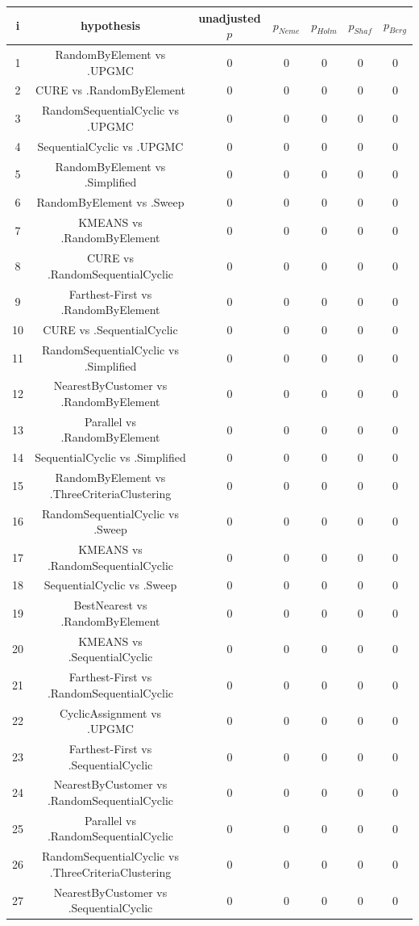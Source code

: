 \documentclass[a4paper,10pt]{article}
\begin{document}
\begin{landscape}
\begin{table}[!htp]
\centering\scriptsize
\begin{tabular}{ccccccc}
i&hypothesis&unadjusted $p$&$p_{Neme}$&$p_{Holm}$&$p_{Shaf}$&$p_{Berg}$\\
\hline1&RandomByElement vs .UPGMC&0&0&0&0&0\\
2&CURE vs .RandomByElement&0&0&0&0&0\\
3&RandomSequentialCyclic vs .UPGMC&0&0&0&0&0\\
4&SequentialCyclic vs .UPGMC&0&0&0&0&0\\
5&RandomByElement vs .Simplified&0&0&0&0&0\\
6&RandomByElement vs .Sweep&0&0&0&0&0\\
7&KMEANS vs .RandomByElement&0&0&0&0&0\\
8&CURE vs .RandomSequentialCyclic&0&0&0&0&0\\
9&Farthest-First vs .RandomByElement&0&0&0&0&0\\
10&CURE vs .SequentialCyclic&0&0&0&0&0\\
11&RandomSequentialCyclic vs .Simplified&0&0&0&0&0\\
12&NearestByCustomer vs .RandomByElement&0&0&0&0&0\\
13&Parallel vs .RandomByElement&0&0&0&0&0\\
14&SequentialCyclic vs .Simplified&0&0&0&0&0\\
15&RandomByElement vs .ThreeCriteriaClustering&0&0&0&0&0\\
16&RandomSequentialCyclic vs .Sweep&0&0&0&0&0\\
17&KMEANS vs .RandomSequentialCyclic&0&0&0&0&0\\
18&SequentialCyclic vs .Sweep&0&0&0&0&0\\
19&BestNearest vs .RandomByElement&0&0&0&0&0\\
20&KMEANS vs .SequentialCyclic&0&0&0&0&0\\
21&Farthest-First vs .RandomSequentialCyclic&0&0&0&0&0\\
22&CyclicAssignment vs .UPGMC&0&0&0&0&0\\
23&Farthest-First vs .SequentialCyclic&0&0&0&0&0\\
24&NearestByCustomer vs .RandomSequentialCyclic&0&0&0&0&0\\
25&Parallel vs .RandomSequentialCyclic&0&0&0&0&0\\
26&RandomSequentialCyclic vs .ThreeCriteriaClustering&0&0&0&0&0\\
27&NearestByCustomer vs .SequentialCyclic&0&0&0&0&0\\

\end{tabular}
\end{table}
\end{landscape}
\end{document}
